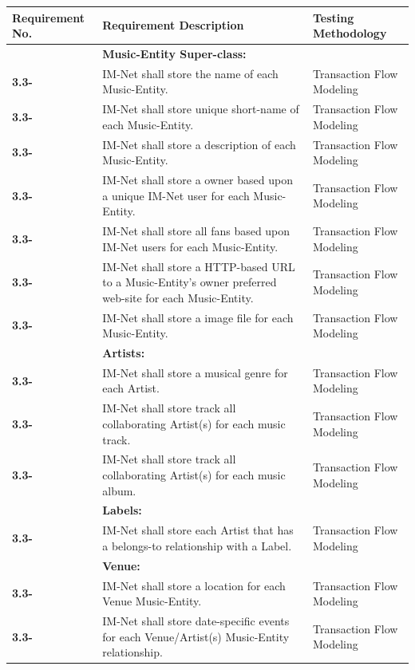 \documentclass[letterpaper,12pt]{article}
\newcounter{rcounter}							%
\newcommand\rnumber{\stepcounter{rcounter}\arabic{rcounter}}
\begin{document}
{\setcounter{rcounter}{0}
\begin{center}
\begin{tabular}{|l|p{4in}|p{2in}|}
\hline 
Requirement No. & Requirement Description & Testing Methodology \\ 
\hline
& \textbf{Music-Entity Super-class:} & \\
\hline
\textbf{3.3-\rnumber} & IM-Net shall store the name of each Music-Entity. & Transaction Flow Modeling \\ 
\hline
\textbf{3.3-\rnumber} & IM-Net shall store unique short-name of each Music-Entity. & Transaction Flow Modeling \\ 
\hline 
\textbf{3.3-\rnumber} & IM-Net shall store a description of each Music-Entity. & Transaction Flow Modeling \\ 
\hline 
\textbf{3.3-\rnumber} & IM-Net shall store a owner based upon a unique IM-Net user for each Music-Entity. & Transaction Flow Modeling \\ 
\hline 
\textbf{3.3-\rnumber} & IM-Net shall store all fans based upon IM-Net users for each Music-Entity. & Transaction Flow Modeling \\ 
\hline 
\textbf{3.3-\rnumber} & IM-Net shall store a HTTP-based URL to a Music-Entity's owner preferred web-site for each Music-Entity. & Transaction Flow Modeling \\ 
\hline
\textbf{3.3-\rnumber} & IM-Net shall store a image file for each Music-Entity. & Transaction Flow Modeling \\ 
\hline
& \textbf{Artists:} & \\
\hline
\textbf{3.3-\rnumber} & IM-Net shall store a musical genre for each Artist. & Transaction Flow Modeling \\ 
\hline 
\textbf{3.3-\rnumber} & IM-Net shall store track all collaborating Artist(s) for each music track. & Transaction Flow Modeling \\ 
\hline
\textbf{3.3-\rnumber} & IM-Net shall store track all collaborating Artist(s) for each music album. & Transaction Flow Modeling \\ 
\hline
& \textbf{Labels:} & \\
\hline
\textbf{3.3-\rnumber} & IM-Net shall store each Artist that has a belongs-to relationship with a Label. & Transaction Flow Modeling \\ 
\hline 
& \textbf{Venue:} & \\
\hline
\textbf{3.3-\rnumber} & IM-Net shall store a location for each Venue Music-Entity. & Transaction Flow Modeling \\ 
\hline 
\textbf{3.3-\rnumber} & IM-Net shall store date-specific events for each Venue/Artist(s) Music-Entity relationship. & Transaction Flow Modeling \\ 
\hline


\end{tabular}
\end{center}}
\end{document}
